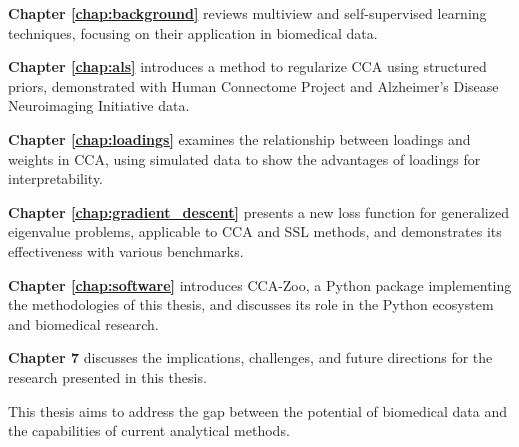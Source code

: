 \textbf{Chapter \ref{chap:background}} reviews multiview and self-supervised learning techniques, focusing on their application in biomedical data.

\textbf{Chapter \ref{chap:als}} introduces a method to regularize CCA using structured priors, demonstrated with Human Connectome Project and Alzheimer's Disease Neuroimaging Initiative data.

\textbf{Chapter \ref{chap:loadings}} examines the relationship between loadings and weights in CCA, using simulated data to show the advantages of loadings for interpretability.

\textbf{Chapter \ref{chap:gradient_descent}} presents a new loss function for generalized eigenvalue problems, applicable to CCA and SSL methods, and demonstrates its effectiveness with various benchmarks.

\textbf{Chapter \ref{chap:software}} introduces CCA-Zoo, a Python package implementing the methodologies of this thesis, and discusses its role in the Python ecosystem and biomedical research.

\textbf{Chapter 7} discusses the implications, challenges, and future directions for the research presented in this thesis.

This thesis aims to address the gap between the potential of biomedical data and the capabilities of current analytical methods.
